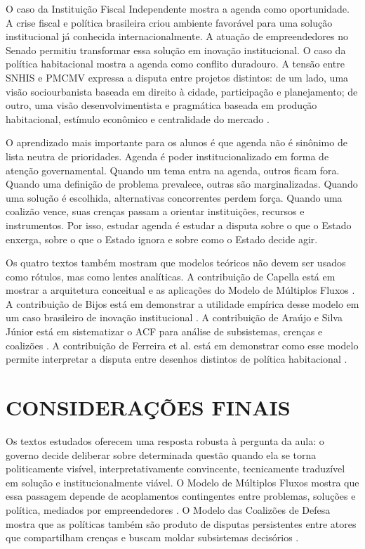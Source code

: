 \documentclass[12pt,a4paper]{article}
\begin{document}
O caso da Instituição Fiscal Independente mostra a agenda como oportunidade. A crise fiscal e política brasileira criou ambiente favorável para uma solução institucional já conhecida internacionalmente. A atuação de empreendedores no Senado permitiu transformar essa solução em inovação institucional. O caso da política habitacional mostra a agenda como conflito duradouro. A tensão entre SNHIS e PMCMV expressa a disputa entre projetos distintos: de um lado, uma visão sociourbanista baseada em direito à cidade, participação e planejamento; de outro, uma visão desenvolvimentista e pragmática baseada em produção habitacional, estímulo econômico e centralidade do mercado \autocites{bijos2024ifi}[][]{ferreira2019habitacional}.

O aprendizado mais importante para os alunos é que agenda não é sinônimo de lista neutra de prioridades. Agenda é poder institucionalizado em forma de atenção governamental. Quando um tema entra na agenda, outros ficam fora. Quando uma definição de problema prevalece, outras são marginalizadas. Quando uma solução é escolhida, alternativas concorrentes perdem força. Quando uma coalizão vence, suas crenças passam a orientar instituições, recursos e instrumentos. Por isso, estudar agenda é estudar a disputa sobre o que o Estado enxerga, sobre o que o Estado ignora e sobre como o Estado decide agir.

Os quatro textos também mostram que modelos teóricos não devem ser usados como rótulos, mas como lentes analíticas. A contribuição de Capella está em mostrar a arquitetura conceitual e as aplicações do Modelo de Múltiplos Fluxos \autocite{capella2022multiplos}. A contribuição de Bijos está em demonstrar a utilidade empírica desse modelo em um caso brasileiro de inovação institucional \autocite{bijos2024ifi}. A contribuição de Araújo e Silva Júnior está em sistematizar o ACF para análise de subsistemas, crenças e coalizões \autocite{araujoSilva2022coalizoes}. A contribuição de Ferreira et al. está em demonstrar como esse modelo permite interpretar a disputa entre desenhos distintos de política habitacional \autocite{ferreira2019habitacional}.

\section{CONSIDERAÇÕES FINAIS}
\label{sec:org805f2c9}
Os textos estudados oferecem uma resposta robusta à pergunta da aula: o governo decide deliberar sobre determinada questão quando ela se torna politicamente visível, interpretativamente convincente, tecnicamente traduzível em solução e institucionalmente viável. O Modelo de Múltiplos Fluxos mostra que essa passagem depende de acoplamentos contingentes entre problemas, soluções e política, mediados por empreendedores \autocites{kingdon2003agendas}[][]{capella2022multiplos}. O Modelo das Coalizões de Defesa mostra que as políticas também são produto de disputas persistentes entre atores que compartilham crenças e buscam moldar subsistemas decisórios \autocites{sabatier1999theories}[][]{araujoSilva2022coalizoes}.
\end{document}

